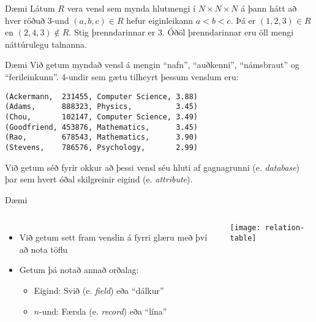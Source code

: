 \documentclass{beamer}
\begin{document}
\begin{frame}{Dæmi}
Látum $R$ vera vensl sem mynda hlutmengi í $N \times N \times N$ á þann hátt að hver röðuð 3-und $(a, b, c) \in R$ hefur eiginleikann $a < b < c$. Þá er $(1, 2, 3) \in R$ en $(2, 4, 3) \notin R$. Stig þrenndarinnar er 3. Óðöl þrenndarinnar eru öll mengi náttúrulegu talnanna.
\end{frame}

\begin{frame}[fragile]{Dæmi}
Við getum myndað vensl á mengin ``nafn'', ``auðkenni'', ``námsbraut'' og ``ferileinkunn''. 4-undir sem gætu tilheyrt þessum venslum eru:

\begin{verbatim}
(Ackermann,  231455, Computer Science, 3.88)
(Adams,      888323, Physics,          3.45)
(Chou,       102147, Computer Science, 3.49)
(Goodfriend, 453876, Mathematics,      3.45)
(Rao,        678543, Mathematics,      3.90)
(Stevens,    786576, Psychology,       2.99)
\end{verbatim}
Við getum séð fyrir okkur að þessi vensl séu hluti af gagnagrunni (e. \emph{database}) þar sem hvert óðal skilgreinir eigind (e. \emph{attribute}). 
\end{frame}

\begin{frame}[fragile]{Dæmi}
\begin{columns}
\begin{itemize}
 \item Við getum sett fram venslin á fyrri glæru með því að nota töflu
 \item Getum þá notað annað orðalag:
 \begin{itemize}
  \item Eigind: Svið (e. \emph{field}) eða ``dálkur''
  \item $n$-und: Færsla (e. \emph{record}) eða ``lína''
 \end{itemize}
\end{itemize}
\begin{center}
\texttt{[image: relation-table]}
\end{center}
\end{columns}
\end{frame}
\end{document}
